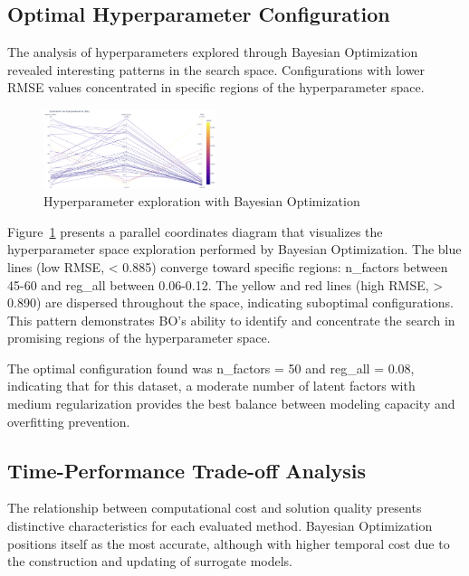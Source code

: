 \documentclass[conference]{IEEEtran}
\begin{document}
\subsection{Optimal Hyperparameter Configuration}

The analysis of hyperparameters explored through Bayesian Optimization revealed interesting patterns in the search space. Configurations with lower RMSE values concentrated in specific regions of the hyperparameter space.

\begin{figure}[htbp]
  \centering
  \includegraphics[width=0.45\textwidth]{fig_hiperparametros.png}
  \caption{Hyperparameter exploration with Bayesian Optimization}
  \label{fig:hiperparametros}
\end{figure}

Figure~\ref{fig:hiperparametros} presents a parallel coordinates diagram that visualizes the hyperparameter space exploration performed by Bayesian Optimization. The blue lines (low RMSE, < 0.885) converge toward specific regions: n\_factors between 45-60 and reg\_all between 0.06-0.12. The yellow and red lines (high RMSE, > 0.890) are dispersed throughout the space, indicating suboptimal configurations. This pattern demonstrates BO's ability to identify and concentrate the search in promising regions of the hyperparameter space.

The optimal configuration found was n\_factors = 50 and reg\_all = 0.08, indicating that for this dataset, a moderate number of latent factors with medium regularization provides the best balance between modeling capacity and overfitting prevention.

\subsection{Time-Performance Trade-off Analysis}

The relationship between computational cost and solution quality presents distinctive characteristics for each evaluated method. Bayesian Optimization positions itself as the most accurate, although with higher temporal cost due to the construction and updating of surrogate models.
\end{document}
